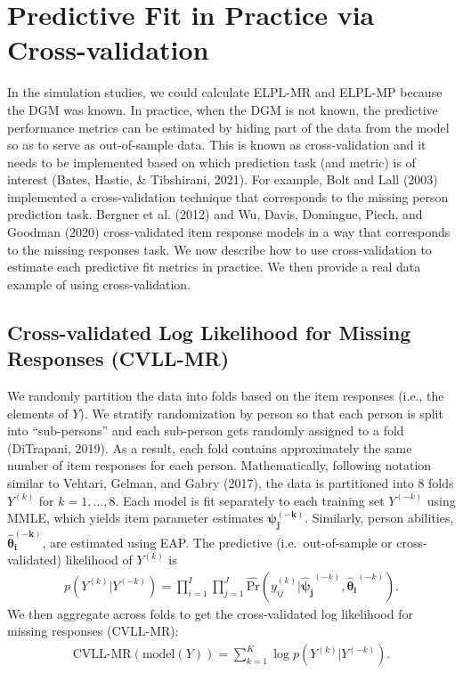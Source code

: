 \documentclass[
  english,
  man,floatsintext]{apa7}
\begin{document}
\hypertarget{real}{%
\section{Predictive Fit in Practice via Cross-validation}\label{real}}

In the simulation studies, we could calculate ELPL-MR and ELPL-MP because the DGM was known. In practice, when the DGM is not known, the predictive performance metrics can be estimated by hiding part of the data from the model so as to serve as out-of-sample data. This is known as cross-validation and it needs to be implemented based on which prediction task (and metric) is of interest (Bates, Hastie, \& Tibshirani, 2021). For example, Bolt and Lall (2003) implemented a cross-validation technique that corresponds to the missing person prediction task. Bergner et al. (2012) and Wu, Davis, Domingue, Piech, and Goodman (2020) cross-validated item response models in a way that corresponds to the missing responses task. We now describe how to use cross-validation to estimate each predictive fit metrics in practice. We then provide a real data example of using cross-validation.

\hypertarget{cross-validated-log-likelihood-for-missing-responses-cvll-mr}{%
\subsection{Cross-validated Log Likelihood for Missing Responses (CVLL-MR)}\label{cross-validated-log-likelihood-for-missing-responses-cvll-mr}}

We randomly partition the data into folds based on the item responses (i.e., the elements of \(Y\)). We stratify randomization by person so that each person is split into ``sub-persons'' and each sub-person gets randomly assigned to a fold (DiTrapani, 2019). As a result, each fold contains approximately the same number of item responses for each person. Mathematically, following notation similar to Vehtari, Gelman, and Gabry (2017), the data is partitioned into 8 folds \(Y^{(k)}\) for \(k = 1, \dots, 8\). Each model is fit separately to each training set \(Y^{(-k)}\) using MMLE, which yields item parameter estimates \(\bm{\psi_j^{(-k)}}\). Similarly, person abilities, \(\bm{\hat\theta_i^{(-k)}}\), are estimated using EAP. The predictive (i.e.~out-of-sample or cross-validated) likelihood of \(Y^{(k)}\) is
\begin{align}
p(Y^{(k)} | Y^{(-k)}) = \prod_{i=1}^{I} \prod_{j=1}^{J}  \hat{\text{Pr}}(y_{ij}^{(k)} | \bm{\hat\psi_j}^{(-k)}, \bm{\hat\theta_i}^{(-k)}).
\end{align}
We then aggregate across folds to get the cross-validated log likelihood for missing responses (CVLL-MR):
\begin{align}
\text{CVLL-MR}(\text{model}(Y)) = \sum_{k = 1}^{K} \log p(Y^{(k)} | Y^{(-k)}).
\end{align}
\end{document}
